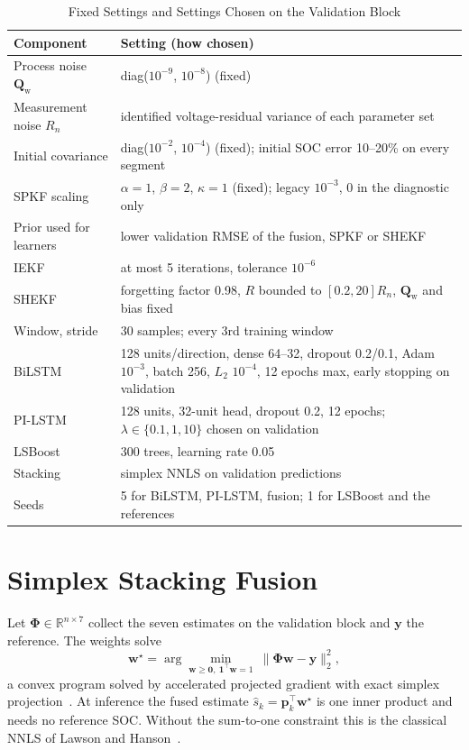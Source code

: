 \documentclass[journal]{IEEEtran}
\newcommand{\T}{^{\!\top}}
\newcommand{\vw}{\boldsymbol{w}}
\newcommand{\mQ}{\mathbf{Q}_{\mathrm{w}}}
\begin{document}
\begin{table}[!t]
\caption{Fixed Settings and Settings Chosen on the Validation Block}
\label{tab:hyp}
\centering\scriptsize
\setlength{\tabcolsep}{2.5pt}
\begin{tabular}{@{}p{2.6cm}p{5.4cm}@{}}
\toprule
Component & Setting (how chosen)\\
\midrule
Process noise $\mQ$ & diag($10^{-9}$, $10^{-8}$) (fixed)\\
Measurement noise $R_n$ & identified voltage-residual variance of each parameter set\\
Initial covariance & diag($10^{-2}$, $10^{-4}$) (fixed); initial SOC error 10--20\% on every segment\\
SPKF scaling & $\alpha=1$, $\beta=2$, $\kappa=1$ (fixed); legacy $10^{-3}$, 0 in the diagnostic only\\
Prior used for learners & lower validation RMSE of the fusion, SPKF or SHEKF\\
IEKF & at most 5 iterations, tolerance $10^{-6}$\\
SHEKF & forgetting factor 0.98, $R$ bounded to $[0.2,20]R_n$, $\mQ$ and bias fixed\\
Window, stride & 30 samples; every 3rd training window\\
BiLSTM & 128 units/direction, dense 64--32, dropout 0.2/0.1, Adam $10^{-3}$, batch 256, $L_2$ $10^{-4}$, 12 epochs max, early stopping on validation\\
PI-LSTM & 128 units, 32-unit head, dropout 0.2, 12 epochs; $\lambda\in\{0.1,1,10\}$ chosen on validation\\
LSBoost & 300 trees, learning rate 0.05\\
Stacking & simplex NNLS on validation predictions\\
Seeds & 5 for BiLSTM, PI-LSTM, fusion; 1 for LSBoost and the references\\
\bottomrule
\end{tabular}
\end{table}

\section{Simplex Stacking Fusion}\label{sec:fusion}
Let $\boldsymbol\Phi\in\mathbb R^{n\times7}$ collect the seven estimates on the validation block and $\mathbf y$ the reference. The weights solve
\begin{equation}
\vw^\star=\arg\min_{\vw\ge\mathbf 0,\ \mathbf 1\T\vw=1}\ \|\boldsymbol\Phi\vw-\mathbf y\|_2^2,
\label{eq:nnls}
\end{equation}
a convex program solved by accelerated projected gradient with exact simplex projection~\cite{beck2009fista,duchi2008simplex}. At inference the fused estimate $\hat s_k=\mathbf p_k\T\vw^\star$ is one inner product and needs no reference SOC. Without the sum-to-one constraint this is the classical NNLS of Lawson and Hanson~\cite{lawson1974lsq}.
\end{document}
